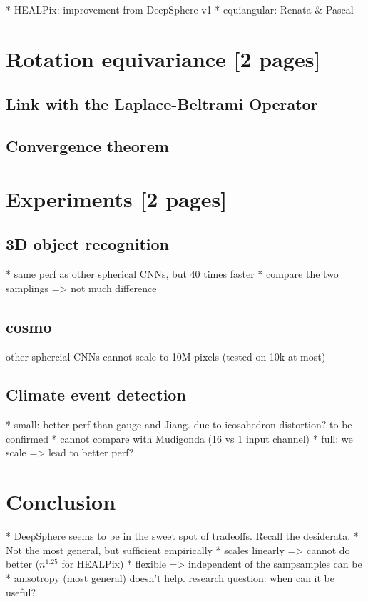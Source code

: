 \documentclass{article} %
\begin{document}
* HEALPix: improvement from DeepSphere v1
* equiangular: Renata \& Pascal

\section{Rotation equivariance [2 pages]}
\subsection{Link with the Laplace-Beltrami Operator}

\subsection{Convergence theorem}

\section{Experiments [2 pages]}

\subsection{3D object recognition}

* same perf as other spherical CNNs, but 40 times faster
* compare the two samplings => not much difference

\subsection{cosmo}

other sphercial CNNs cannot scale to 10M pixels (tested on 10k at most)

\subsection{Climate event detection}

* small: better perf than gauge and Jiang. due to icosahedron distortion? to be confirmed
* cannot compare with Mudigonda (16 vs 1 input channel)
* full: we scale => lead to better perf?

\section{Conclusion}

* DeepSphere seems to be in the sweet spot of tradeoffs. Recall the desiderata.
  * Not the most general, but sufficient empirically
  * scales linearly => cannot do better ($n^1.25$ for HEALPix)
  * flexible => independent of the sampsamples can be 
* anisotropy (most general) doesn't help. research question: when can it be useful?
\end{document}
